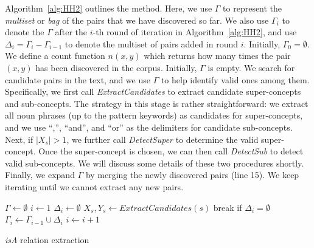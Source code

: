 \documentclass[10pt,journal,cspaper,compsoc]{IEEEtran}
\begin{document}
Algorithm~\ref{alg:HH2} outlines the method. Here, we use $\Gamma$ to represent the {\em multiset} or {\em bag} of the pairs that we have discovered so far. We also use $\Gamma_i$ to denote the $\Gamma$ after the $i$-th round of iteration in Algorithm~\ref{alg:HH2}, and use $\Delta_i=\Gamma_i - \Gamma_{i-1}$ to denote the multiset of pairs added in round $i$. Initially, $\Gamma_0=\emptyset$. We define a count function $n(x, y)$ which returns how many times the pair $(x,y)$ has been discovered in the corpus.
Initially, $\Gamma$ is empty. We search for candidate pairs in the text, and we use $\Gamma$ to help identify valid ones among them. Specifically, we first call \emph{ExtractCandidates} to extract candidate super-concepts and sub-concepts. The strategy in this stage is rather straightforward: we extract all noun phrases (up to the pattern keywords) as candidates for super-concepts, and we use ``,'', ``and'', and ``or'' as the delimiters for candidate sub-concepts. Next, if $|X_s|>1$, we further call \emph{DetectSuper} to determine the valid super-concept. Once the super-concept is chosen, we can then call \emph{DetectSub} to detect valid sub-concepts. We will discuss some details of these two procedures shortly. 
Finally, we expand $\Gamma$ by merging the newly discovered pairs (line 15).
We keep iterating until we cannot extract any new pairs.

\begin{algorithm}[t]
  \SetAlgoLined
  \SetAlgoLined
  $\Gamma \leftarrow \emptyset$\;
  $i\leftarrow 1$\;
   {
    $\Delta_i \leftarrow \emptyset$\;
     {
        $X_s, Y_s \leftarrow ExtractCandidates(s)$ \;
    }
    break if $\Delta_i=\emptyset$\;
    $\Gamma_i\leftarrow\Gamma_{i-1}\cup\Delta_i$\;
    $i\leftarrow i+1$\;
  }
  \Return{$\Gamma$\;}
  \caption{\emph{isA} relation extraction}
\label{alg:HH2}
\end{algorithm}
\end{document}
